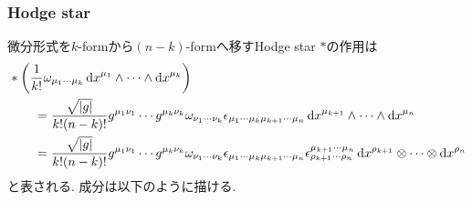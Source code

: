 \documentclass[dvipdfmx]{jsarticle}
\begin{document}
\subsubsection{Hodge star}
\label{sec: k-form: Hodge star}

微分形式を$k$-formから$(n-k)$-formへ移すHodge star $*$の作用は
\begin{equation}
    \label{eq: k-form: Hodge star def in Einstein contraction}
    \begin{split}
        &
        \ast\qty(
            \frac{1}{k!}
            \omega_{\mu_1\cdots\mu_k}
            \dd{x}^{\mu_1}
            \wedge\cdots\wedge
            \dd{x}^{\mu_k}
        )
        \\
        &\qquad
        =
        \frac{\sqrt{|g|}}{k!(n-k)!}
        g^{\mu_1\nu_1}\cdots g^{\mu_k\nu_k}
        \omega_{\nu_1\cdots\nu_k}
        \epsilon_{\mu_1\cdots\mu_k\mu_{k+1}\cdots\mu_n}
        \dd{x}^{\mu_{k+1}}
        \wedge\cdots\wedge
        \dd{x}^{\mu_n}
        \\
        &\qquad
        =
        \frac{\sqrt{|g|}}{k!(n-k)!}
        g^{\mu_1\nu_1}\cdots g^{\mu_k\nu_k}
        \omega_{\nu_1\cdots\nu_k}
        \epsilon_{\mu_1\cdots\mu_k\mu_{k+1}\cdots\mu_n}
        \epsilon^{\mu_{k+1}\cdots\mu_{n}}_{\rho_{k+1}\cdots\rho_{n}}
        \dd{x}^{\rho_{k+1}}
        \otimes\cdots\otimes
        \dd{x}^{\rho_n}
    \end{split}
\end{equation}
と表される.
成分は以下のように描ける.
\end{document}
